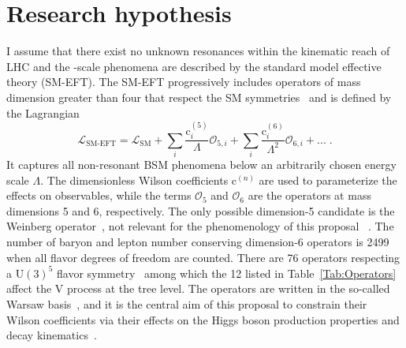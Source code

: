 \documentclass[a4paper,11pt]{article}
\renewcommand{\PV}{{{{V}}}\xspace}
\newcommand{\VH}{{{\PV}{\PH}}\xspace}
\begin{document}
\section{Research hypothesis}
\label{sec:research_hypo}

I assume that there exist no unknown resonances within the kinematic reach of LHC and 
the {\TeV}-scale phenomena are described by the standard model effective theory (SM-EFT). 
The SM-EFT progressively includes operators of mass dimension greater than four that respect the SM symmetries~\cite{Jenkins:2013zja,Alonso:2013hga,Jenkins:2013wua,Englert:2014cva,Brivio:2017vri} and is defined by the Lagrangian
\begin{equation}
\mathcal{L}_{\text{SM-EFT}} = \mathcal{L}_{\text{SM}} +  {\sum}_{i} \frac{\text{c}_i^{\left(5\right)}}{\Lambda} \mathcal{O}_{5,i} + {\sum}_{i} \frac{\text{c}_i^{\left(6\right)}}{{\Lambda}^{2}} \mathcal{O}_{6,i} + ... \;.
\label{Eq:SMEFT}
\end{equation}
It captures all non-resonant BSM phenomena below an arbitrarily chosen energy scale $\Lambda$.
The dimensionless Wilson coefficients $\text{c}^{\left(n\right)}$ are used to parameterize the effects on observables, while the terms $\mathcal{O}_5$ and $\mathcal{O}_6$ are  the operators at mass dimensions 5 and 6, respectively.
The only possible dimension-5 candidate is the  Weinberg operator~\cite{PhysRevLett.43.1566}, not relevant for the phenomenology of this proposal ~\cite{Bonnet:2009ej}.
The number of baryon and lepton number conserving dimension-6 operators is 2499 when all flavor degrees of freedom are counted. There are 76 operators respecting a $\textrm{U}(3)^5$ flavor symmetry~\cite{Alonso:2013hga} among which the 12 listed in Table~\ref{Tab:Operators} affect the \VH process at the tree level.
The operators are written in the so-called Warsaw basis~\cite{Grzadkowski:2010es}, and it is the central aim of this proposal to constrain their Wilson coefficients via their effects on the Higgs boson production properties and decay kinematics~\cite{Hagiwara:1993qt,Ellis:2014dva,Murphy:2017omb,Baglio:2020oqu}.
\end{document}
